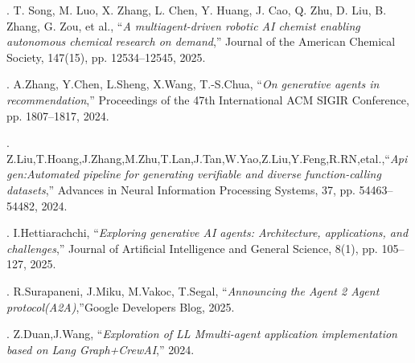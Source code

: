 \documentclass[12pt,letterpaper]{article}
\begin{document}
\thispagestyle{empty}
\begingroup
\sloppy
\fontsize{12pt}{25.8pt}\selectfont
{}. T. Song, M. Luo, X. Zhang, L. Chen, Y. Huang, J. Cao, Q. Zhu, D. Liu, B. Zhang, G. Zou, et al., ``\textit{A multiagent-driven robotic AI chemist enabling autonomous chemical research on demand},'' Journal of the American Chemical Society, 147(15), pp. 12534–12545, 2025.

\vspace{6pt}
. A.Zhang, Y.Chen, L.Sheng, X.Wang, T.-S.Chua, ``\textit{On generative agents in recommendation},'' Proceedings of the 47th International ACM SIGIR Conference, pp. 1807–1817, 2024.

\vspace{6pt}
. Z.Liu,T.Hoang,J.Zhang,M.Zhu,T.Lan,J.Tan,W.Yao,Z.Liu,Y.Feng,R.RN,etal.,``\textit{Apigen:Automated pipeline for generating verifiable and diverse function-calling datasets},'' Advances in Neural Information Processing Systems, 37, pp. 54463–54482, 2024.

\vspace{6pt}
. I.Hettiarachchi, ``\textit{Exploring generative AI agents: Architecture, applications, and challenges},'' Journal of Artificial Intelligence and General Science, 8(1), pp. 105–127, 2025.

\vspace{6pt}
. R.Surapaneni, J.Miku, M.Vakoc, T.Segal, ``\textit{Announcing the Agent 2 Agent protocol(A2A)},''Google Developers Blog, 2025.

\vspace{6pt}
. Z.Duan,J.Wang, ``\textit{Exploration of LL Mmulti-agent application implementation based on Lang Graph+CrewAI},'' 2024.
\endgroup
\restoregeometry
\end{document}
